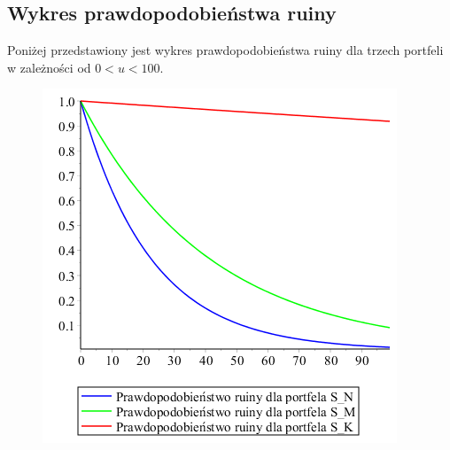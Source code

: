 \documentclass[12pt]{article}
\theoremstyle{twierdzenie}
\theoremstyle{definition}
\begin{document}
\subsection{Wykres prawdopodobieństwa ruiny}
Poniżej przedstawiony jest wykres prawdopodobieństwa ruiny dla trzech portfeli w zależności od $0<u<100$.
\begin{figure}[H]
\begin{center}
\includegraphics[scale=.7]{ruina}
\end{center}
\end{figure}
\end{document}
